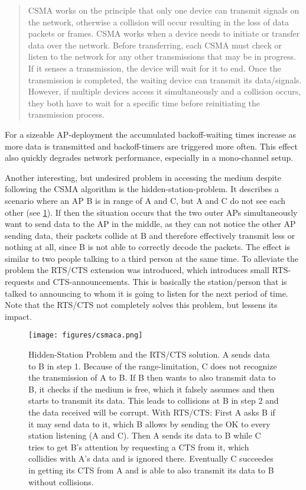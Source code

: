 	\begin{quotation}
	  CSMA works on the principle that only one device can transmit signals on the network, 
	  otherwise a collision will occur resulting in the loss of data packets or frames. 
	  CSMA works when a device needs to initiate or transfer data over the network. 
	  Before transferring, each CSMA must check or listen to the network for any other transmissions that may be in progress. 
	  If it senses a transmission, the device will wait for it to end. Once the transmission is completed, 
	  the waiting device can transmit its data/signals. However, if multiple devices access it simultaneously and a collision occurs, 
	  they both have to wait for a specific time before reinitiating the transmission process. 
	\end{quotation}
	
	For a sizeable \ac{AP}-deployment the accumulated backoff-waiting times increase as more data is transmitted and backoff-timers are triggered more often.
	This effect also quickly degrades network performance, especially in a mono-channel setup.
	
	Another interesting, but undesired problem in accessing the medium despite following the CSMA algorithm is the hidden-station-problem.
	It describes a scenario where an \ac{AP} B is in range of A and C, but A and C do not see each other (see \ref{fig:csmaca}).
	If then the situation occurs that the two outer APs simultaneously want to send data to the \ac{AP} in the middle, as they can not notice the 
	other AP sending data, their packets collide at B and therefore effectively transmit less or nothing at all, since B is not able to correctly decode the packets.
	The effect is similar to two people talking to a third person at the same time.
	To alleviate the problem the RTS/CTS extension was introduced, which introduces small \ac{RTS}-requests and \ac{CTS}-announcements. 
	This is basically the station/person that is talked to announcing to whom it is going to listen for the next period of time.
	Note that the RTS/CTS not completely solves this problem, but lessens its impact.
	
	\begin{figure}[th!]
	  \centering
	  \texttt{[image: figures/csmaca.png]}
	  \caption{Hidden-Station Problem and the RTS/CTS solution. A sends data to B in step 1.
	    Because of the range-limitation, C does not recognize the transmission of A to B. 
	    If B then wants to also transmit data to B, it checks if the medium is free, which it falsely assumes
	    and then starts to transmit its data. This leads to collisions at B in step 2 and the data received will be corrupt.
	    With RTS/CTS: First A asks B if it may send data to it, which B allows by sending the OK to every station listening (A and C). 
	    Then A sends its data to B while C tries to get B's attention by requesting a CTS from it, which collidies with A's data and is ignored there.
	    Eventually C succeedes in getting its CTS from A and is able to also transmit its data to B without collisions.}
	  \label{fig:csmaca}
	\end{figure}


